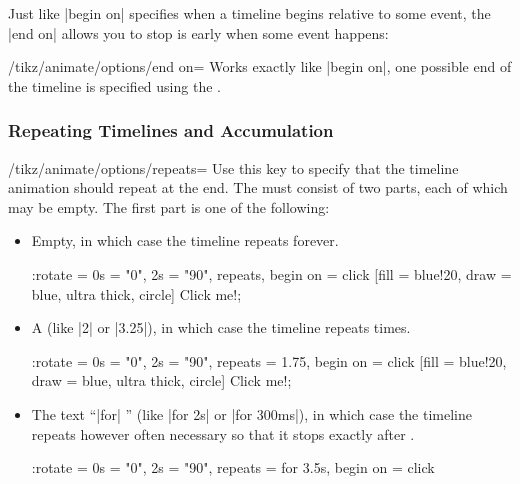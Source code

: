 Just like |begin on| specifies when a timeline begins relative to some event,
the |end on| allows you to stop is early when some event happens:

\begin{key}{/tikz/animate/options/end on=}
    Works exactly like |begin on|, one possible end of the timeline is
    specified using the .
\end{key}


\subsubsection{Repeating Timelines and Accumulation}

\begin{key}{/tikz/animate/options/repeats=}
    Use this key to specify that the timeline animation should repeat at the
    end. The  must consist of two parts, each of which may
    be empty. The first part is one of the following:
    \begin{itemize}
        \item Empty, in which case the timeline repeats forever.
\begin{codeexample}[imagesource={standalone/pgfmanual-en-tikz-animations-animation-71.svg}]
\tikz \node :rotate = { 0s = "0", 2s = "90",
                        repeats, begin on = click }
    [fill = blue!20, draw = blue, ultra thick, circle] {Click me!};
\end{codeexample}
        \item A  (like |2| or |3.25|), in which case the timeline
            repeats  times.
\begin{codeexample}[imagesource={standalone/pgfmanual-en-tikz-animations-animation-72.svg}]
\tikz \node :rotate = { 0s = "0", 2s = "90",
                        repeats = 1.75, begin on = click }
    [fill = blue!20, draw = blue, ultra thick, circle] {Click me!};
\end{codeexample}
        \item The text ``|for| '' (like |for 2s| or |for 300ms|), in
            which case the timeline repeats however often necessary so that it
            stops exactly after .
\begin{codeexample}[imagesource={standalone/pgfmanual-en-tikz-animations-animation-73.svg}]
\tikz \node :rotate = { 0s = "0", 2s = "90",
                        repeats = for 3.5s, begin on = click }

\end{codeexample}
\end{itemize}
\end{key}

